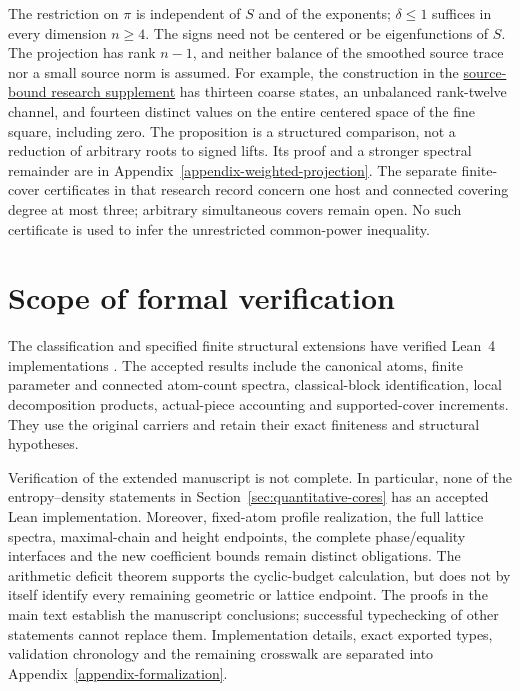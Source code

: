 \documentclass[a4paper,11pt,reqno]{amsart}
\theoremstyle{plain}
\theoremstyle{definition}
\theoremstyle{remark}
\begin{document}
The restriction on $\pi$ is independent of $S$ and of the exponents;
$\delta\le1$ suffices in every dimension $n\ge4$.
The signs need not be centered or be eigenfunctions of $S$.  The
projection has rank $n-1$, and neither balance of the smoothed source
trace nor a small source norm is assumed.  For example, the construction
in the \href{https://github.com/SamPetkov/Erdos593/blob/be6f7637147e0a02e8f03fa4f0ad770370b2327a/review/2026-10-10-common-power-density/continuation7/continuation7_source_weighted_complement.md}{source-bound research supplement}
has thirteen coarse states, an
unbalanced rank-twelve channel, and fourteen distinct values on the
entire centered space of the fine square, including zero.
The proposition is a structured comparison, not a reduction of
arbitrary roots to signed lifts.  Its proof and a stronger spectral
remainder are in Appendix~\ref{appendix-weighted-projection}.
The separate finite-cover certificates in that research record concern
one host and connected covering degree at most three; arbitrary
simultaneous covers remain open.  No such certificate is used to infer
the unrestricted common-power inequality.

\section*{Scope of formal verification}

The classification and specified finite structural extensions have verified
Lean~4 implementations \citep{demoura2021,mathlib2020}.  The accepted results
include the canonical atoms, finite parameter and connected atom-count spectra,
classical-block identification, local decomposition products, actual-piece
accounting and supported-cover increments.  They use the original carriers
and retain their exact finiteness and structural hypotheses.

Verification of the extended manuscript is not complete.  In particular,
none of the entropy--density statements in
Section~\ref{sec:quantitative-cores} has an accepted Lean implementation.
Moreover,
fixed-atom profile realization, the full lattice spectra, maximal-chain and
height endpoints, the complete phase/equality interfaces and the new
coefficient bounds remain distinct obligations.  The arithmetic deficit
theorem supports the cyclic-budget calculation, but does not by itself
identify every remaining geometric or lattice endpoint.  The proofs in the
main text establish the manuscript conclusions; successful typechecking of
other statements cannot replace them.  Implementation details, exact exported
types, validation chronology and the remaining crosswalk are separated into
Appendix~\ref{appendix-formalization}.
\end{document}
